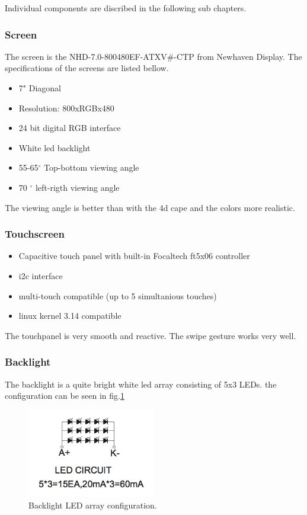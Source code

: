  Individual components are discribed in the following sub chapters.

\subsubsection{Screen}
The screen is the NHD-7.0-800480EF-ATXV\#-CTP from Newhaven Display. The specifications of the screens are listed bellow.
\begin{itemize}
  \item {7" Diagonal}
  \item{Resolution: 800xRGBx480}
  \item{24 bit digital RGB interface}
  \item{White led backlight}
  \item{55-65$^{\circ}$ Top-bottom viewing angle }
  \item{70 $^{\circ}$ left-rigth viewing angle}
\end{itemize}
The viewing angle is better than with the 4d cape and the colors more realistic.

\subsubsection{Touchscreen}

\begin{itemize}
  \item {Capacitive touch panel with built-in Focaltech ft5x06 controller}
  \item {i2c interface}
  \item {multi-touch compatible (up to 5 simultanious touches)}
  \item {linux kernel 3.14 compatible}
\end{itemize}
The touchpanel is very smooth and reactive. The swipe gesture works very well.

\subsubsection{Backlight}
\label{chap: backlight}
The backlight is a quite bright white led array consisting of 5x3 LEDs. the configuration can be seen in fig.\ref{fig:backlight_led}

\begin{figure}[!htb]
    \centering
    \includegraphics[width=0.5\textwidth,keepaspectratio]{chap/hardFig/backlight_led_circuit}
    \caption{Backlight LED array configuration.}
    \label{fig:backlight_led}
\end{figure}

